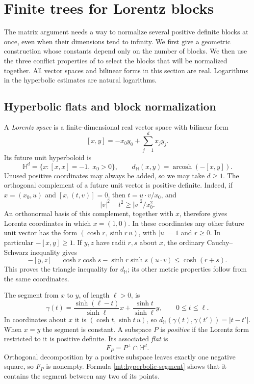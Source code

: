 \section{Finite trees for Lorentz blocks}\label{mt:section}

The matrix argument needs a way to normalize several positive definite
blocks at once, even when their dimensions tend to infinity.  We first
give a geometric construction whose constants depend only on the number
of blocks.  We then use the three conflict properties of
 to select the blocks that will be normalized
together.  All vector spaces and bilinear forms in this section are real.
Logarithms in the hyperbolic estimates are natural logarithms.

\subsection{Hyperbolic flats and block normalization}

A \emph{Lorentz space} is a finite-dimensional real vector space with
bilinear form
\[
 [x,y]=-x_0y_0+\sum_{j=1}^d x_jy_j.
\]
Its future unit hyperboloid is
\[
 \mathbb H^d=\{x:[x,x]=-1,\ x_0>0\},
 \qquad d_{\mathbb H}(x,y)=\operatorname{arcosh}(-[x,y]).
\]
Unused positive coordinates may always be added, so we may take
\(d\ge1\).  The orthogonal complement of a future unit vector is positive
definite.  Indeed, if \(x=(x_0,u)\) and \([x,(t,v)]=0\), then
\(t=u\cdot v/x_0\), and
\[
 |v|^2-t^2\ge |v|^2/x_0^2.
\]
An orthonormal basis of this complement, together with \(x\), therefore
gives Lorentz coordinates in which \(x=(1,0)\).  In these coordinates any
other future unit vector has the form
\((\cosh r,\sinh r\,u)\), with \(|u|=1\) and \(r\ge0\).
In particular \(-[x,y]\ge1\).  If \(y,z\) have radii \(r,s\) about
\(x\), the ordinary Cauchy--Schwarz inequality gives
\[
 -[y,z]=\cosh r\cosh s-\sinh r\sinh s\,(u\cdot v)
 \le \cosh(r+s).
\]
This proves the triangle inequality for \(d_{\mathbb H}\); its other
metric properties follow from the same coordinates.

The segment from \(x\) to \(y\), of length \(\ell>0\), is
\begin{equation}\label{mt:hyperbolic-segment}
 \gamma(t)=\frac{\sinh(\ell-t)}{\sinh\ell}x
            +\frac{\sinh t}{\sinh\ell}y,
 \qquad 0\le t\le\ell.
\end{equation}
In coordinates about \(x\) it is \((\cosh t,\sinh t\,u)\), so
\(d_{\mathbb H}(\gamma(t),\gamma(t'))=|t-t'|\).
When \(x=y\) the segment is constant.  A subspace \(P\) is
\emph{positive} if the Lorentz form restricted to it is positive
definite.  Its associated \emph{flat} is
\[
 F_P=P^\perp\cap\mathbb H^d.
\]
Orthogonal decomposition by a positive subspace leaves exactly one
negative square, so \(F_P\) is nonempty.  Formula
\eqref{mt:hyperbolic-segment} shows that it contains the segment between
any two of its points.

